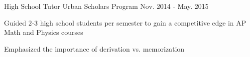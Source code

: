 \begin{cventries}
\iffalse
  \cventry
    {Office Assistant} %
    {Zahn Innovation Center} %
	{Jan. 2015 - May. 2015} %
    {} %
    {
      \begin{cvitems} %
        \item {Processed applications and deliverables from competing startups}
        \item {Sorted incoming internship and funding offers and directed them
		  to the appropriate individuals}
        \item {Motivated the competing teams and provided feedback on their ideas}
        \item {Arranged events to inspire entrepreneurship in startup members}
      \end{cvitems}
    }
\fi

\iftrue
  \cventry
    {High School Tutor} %
    {Urban Scholars Program} %
	{Nov. 2014 - May. 2015} %
    {} %
    {
      \begin{cvitems} %
        \item {Guided 2-3 high school students per semester to gain a competitive
		  edge in AP Math and Physics courses}
        \item {Emphasized the importance of derivation vs. memorization}
      \end{cvitems}
    }
\fi


\end{cventries}
